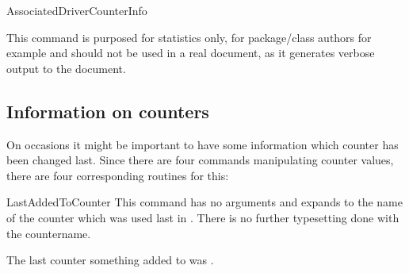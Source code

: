 \documentclass[12pt,paper=a4]{ltxdoc}
\begin{document}
\begin{docCommand}{AssociatedDriverCounterInfo}{}

This command is purposed for statistics only, for package/class authors for example and should not be used in a real document, as it generates verbose output to the document.



\begin{dispExample}
%
%
\end{dispExample}

\begin{dispExample}
%
\end{dispExample}

\begin{dispExample}
%
\end{dispExample}


\end{docCommand}%

\subsection{Information on counters}

On occasions it might be important to have some information which counter has been changed last. Since there are four commands manipulating counter values, there are four corresponding routines for this:

\begin{docCommand}{LastAddedToCounter}{}
This command has no arguments and expands to the name of the counter which was used last in . There is no further typesetting done with the countername. 

\begin{dispExample}
  
  \addtocounter{SomeCounter}{10}

  The last counter something added to was \PrettyPrintCounterName{\LastAddedToCounter}.
\end{dispExample}%

\end{docCommand}%
\end{document}
